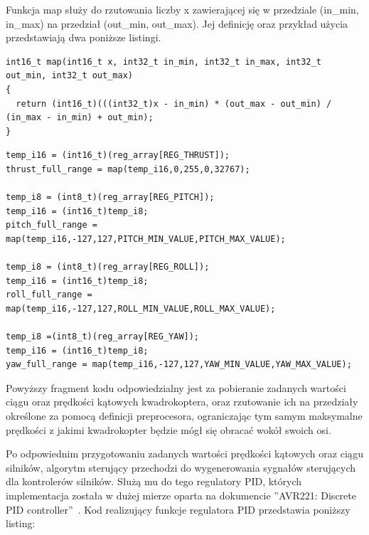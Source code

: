 Funkcja map służy do rzutowania liczby x zawierającej się w przedziale (in\_min, in\_max) na przedział (out\_min, out\_max). Jej definicję oraz przykład użycia przedstawiają dwa poniższe listingi.

\begin{lstlisting}
int16_t map(int16_t x, int32_t in_min, int32_t in_max, int32_t out_min, int32_t out_max)
{
  return (int16_t)(((int32_t)x - in_min) * (out_max - out_min) / (in_max - in_min) + out_min);
}
\end{lstlisting}



\begin{lstlisting}
temp_i16 = (int16_t)(reg_array[REG_THRUST]);
thrust_full_range = map(temp_i16,0,255,0,32767);

temp_i8 = (int8_t)(reg_array[REG_PITCH]);
temp_i16 = (int16_t)temp_i8;
pitch_full_range = map(temp_i16,-127,127,PITCH_MIN_VALUE,PITCH_MAX_VALUE);

temp_i8 = (int8_t)(reg_array[REG_ROLL]);
temp_i16 = (int16_t)temp_i8;
roll_full_range = map(temp_i16,-127,127,ROLL_MIN_VALUE,ROLL_MAX_VALUE);

temp_i8 =(int8_t)(reg_array[REG_YAW]);
temp_i16 = (int16_t)temp_i8;
yaw_full_range = map(temp_i16,-127,127,YAW_MIN_VALUE,YAW_MAX_VALUE);
\end{lstlisting}

Powyższy fragment kodu odpowiedzialny jest za pobieranie zadanych wartości ciągu oraz prędkości kątowych kwadrokoptera, oraz rzutowanie ich na przedziały określone za pomocą definicji preprocesora, ograniczając tym samym maksymalne prędkości z jakimi kwadrokopter będzie mógł się obracać wokół swoich osi.

Po odpowiednim przygotowaniu zadanych wartości prędkości kątowych oraz ciągu silników, algorytm sterujący przechodzi do wygenerowania sygnałów sterujących dla kontrolerów silników. Służą mu do tego regulatory PID, których implementacja została w dużej mierze oparta na dokumencie ''AVR221: Discrete PID controller''~\cite{ds_avrpid}. Kod realizujący funkcje regulatora PID przedstawia poniższy listing:

